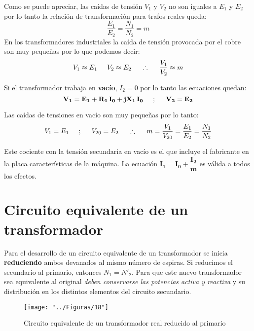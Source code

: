 Como se puede apreciar, las caídas de tensión $V_{1}$ y $V_{2}$ no son iguales a $E_{1}$ y $E_{2}$ por lo tanto la relación de transformación para trafos reales queda:
\begin{equation}
	\dfrac{E_{1}}{E_{2}}=\dfrac{N_{1}}{N_{2}}=m
\end{equation}
En los transformadores industriales la caída de tensión provocada por el cobre son muy pequeñas por lo que podemos decir:
\begin{equation}
	V_{1} \approx E_{1} \hspace{5mm}  V_{2} \approx E_{2}  \hspace{5mm} \therefore \hspace{5mm} \dfrac{V_{1}}{V_{2}} \approx m
\end{equation}

Si el transformador trabaja en \textbf{vacío}, $I_{2}=0$ por lo tanto las ecuaciones quedan:
\begin{equation}
	\mathbf{V_{1}=E_{1} + R_{1} \, I_{0} + jX_{1} \, I_{0}} \hspace{5mm} ; \hspace{5mm} \mathbf{V_{2}=E_{2}}
\end{equation}

Las caídas de tensiones en vacío son muy pequeñas por lo tanto:
\begin{equation}
	V_{1}=E_{1} \hspace{5mm} ; \hspace{5mm} V_{20}=E_{2} \hspace{5mm} \therefore \hspace{5mm} m=\dfrac{V_{1}}{V_{20}}=\dfrac{E_{1}}{E_{2}}=\dfrac{N_{1}}{N_{2}}
\end{equation}

Este cociente con la tensión secundaria en vacío es el que incluye el fabricante en la placa características de la máquina. La ecuación $\mathbf{I_{1}=I_{0}+\dfrac{I_{2}}{m}}$ es válida a todos los efectos.

\section{Circuito equivalente de un transformador}
Para el desarrollo de un circuito equivalente de un transformador se inicia \textbf{reduciendo} ambos devanados al mismo número de espiras. Si reducimos el secundario al primario, entonces $N_{1}=N'_{2}$. Para que este nuevo transformador sea equivalente al original \textit{deben conservarse las potencias activa y reactiva} y su distribución en los distintos elementos del circuito secundario. 
 \begin{figure}[H]
	\centering
	\texttt{[image: "../Figuras/18"]}
	\caption{Circuito equivalente de un transformador real reducido al primario}
\end{figure} 

